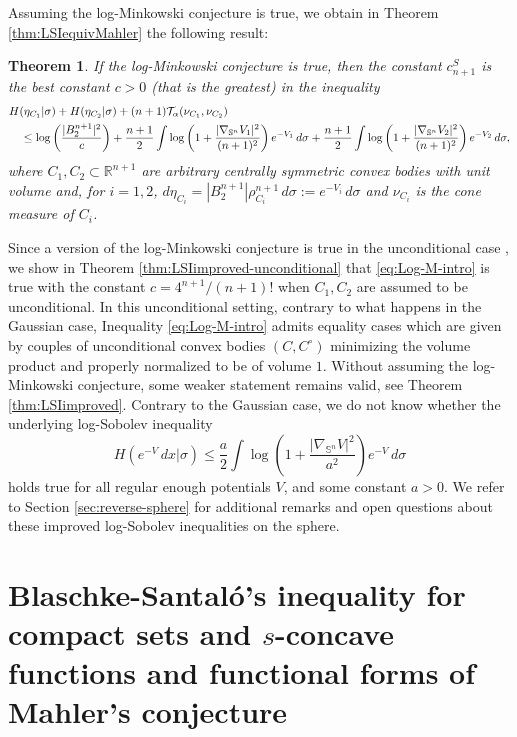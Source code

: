 \documentclass[10pt]{amsart}
\newtheorem*{intro_thm}{Theorem}
\theoremstyle{definition}
\theoremstyle{remark}
\newcommand{\R}{\mathbb{R}}
\newcommand{\Sd}{\mathbb{S}}
\begin{document}
Assuming the log-Minkowski conjecture is true, we obtain in Theorem \ref{thm:LSIequivMahler} the following result:
\begin{intro_thm}
     If the log-Minkowski conjecture is true, then the constant $c_{n+1}^S$ is the best constant $c>0$ (that is the greatest) in the inequality
    \begin{align}\label{eq:Log-M-intro}
     &H(\eta_{C_1} | \sigma)+ H(\eta_{C_2} | \sigma) + (n+1)\mathcal{T}_\alpha(\nu_{C_1},\nu_{C_2})\\
    &\notag\quad\leq \log \left(\frac{|B_2^{n+1}|^2}{c}\right) + \frac{n+1}{2}\int \log\left(1+ \frac{|\nabla_{\Sd^n}V_1|^2}{(n+1)^2} \right)e^{-V_{1}}\,d\sigma 
    + \frac{n+1}{2}\int \log\left(1+ \frac{|\nabla_{\Sd^n}V_2|^2}{(n+1)^2} \right)e^{-V_{2}}\,d\sigma,
    \end{align}
    where $C_1,C_2 \subset \R^{n+1}$ are arbitrary centrally symmetric convex bodies with unit volume and, for $i=1,2$, $d\eta_{C_i} = |B_2^{n+1}| \rho_{C_i}^{n+1}\,d\sigma := e^{-V_i}\,d\sigma$ and $\nu_{C_i}$ is the cone measure of $C_i$.
\end{intro_thm}
Since a version of the log-Minkowski conjecture is true in the unconditional case \cite{Sar15}, we show in Theorem \ref{thm:LSIimproved-unconditional} that \eqref{eq:Log-M-intro} is true with the constant $c=4^{n+1}/(n+1)!$ when $C_1,C_2$ are assumed to be unconditional. In this unconditional setting,  contrary to what happens in the Gaussian case, Inequality \eqref{eq:Log-M-intro} admits equality cases which are given by couples of unconditional convex bodies $(C,C^\circ)$ minimizing the volume product and properly normalized to be of volume $1$. Without assuming the log-Minkowski conjecture, some weaker statement remains valid, see Theorem \ref{thm:LSIimproved}. 
Contrary to the Gaussian case, we do not know whether the underlying log-Sobolev inequality 
\[
H(e^{-V}\,dx | \sigma) \leq \frac{a}{2}\int \log\left(1+ \frac{|\nabla_{\Sd^n}V|^2}{a^2} \right)e^{-V}\,d\sigma 
\]
holds true for all regular enough potentials $V$, and some constant $a>0$.
We refer to Section \ref{sec:reverse-sphere} for additional remarks and open questions about these improved log-Sobolev inequalities on the sphere. 


\section{Blaschke-Santal\'o's inequality for compact sets and $s$-concave functions and functional forms of Mahler's conjecture}\label{sec:BScompact sets}
\end{document}
